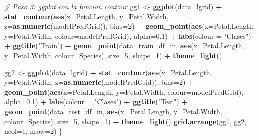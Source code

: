 \documentclass[]{book}
\newenvironment{Shaded}{\begin{snugshade}}{\end{snugshade}}
\newcommand{\CommentTok}[1]{\textcolor[rgb]{0.56,0.35,0.01}{\textit{#1}}}
\newcommand{\DataTypeTok}[1]{\textcolor[rgb]{0.13,0.29,0.53}{#1}}
\newcommand{\DecValTok}[1]{\textcolor[rgb]{0.00,0.00,0.81}{#1}}
\newcommand{\FloatTok}[1]{\textcolor[rgb]{0.00,0.00,0.81}{#1}}
\newcommand{\KeywordTok}[1]{\textcolor[rgb]{0.13,0.29,0.53}{\textbf{#1}}}
\newcommand{\NormalTok}[1]{#1}
\newcommand{\OperatorTok}[1]{\textcolor[rgb]{0.81,0.36,0.00}{\textbf{#1}}}
\newcommand{\StringTok}[1]{\textcolor[rgb]{0.31,0.60,0.02}{#1}}
\begin{document}
\begin{Shaded}
\begin{Highlighting}[]
  \CommentTok{# Paso 3: ggplot con la funcion contour}
\NormalTok{  gg1 <-}\StringTok{ }\KeywordTok{ggplot}\NormalTok{(}\DataTypeTok{data=}\NormalTok{lgrid) }\OperatorTok{+}
\StringTok{    }\KeywordTok{stat_contour}\NormalTok{(}\KeywordTok{aes}\NormalTok{(}\DataTypeTok{x=}\NormalTok{Petal.Length, }\DataTypeTok{y=}\NormalTok{Petal.Width, }\DataTypeTok{z=}\KeywordTok{as.numeric}\NormalTok{(modelPredGrid)), }\DataTypeTok{bins=}\DecValTok{2}\NormalTok{) }\OperatorTok{+}
\StringTok{    }\KeywordTok{geom_point}\NormalTok{(}\KeywordTok{aes}\NormalTok{(}\DataTypeTok{x=}\NormalTok{Petal.Length, }\DataTypeTok{y=}\NormalTok{Petal.Width, }\DataTypeTok{colour=}\NormalTok{modelPredGrid), }\DataTypeTok{alpha=}\FloatTok{0.1}\NormalTok{) }\OperatorTok{+}
\StringTok{    }\KeywordTok{labs}\NormalTok{(}\DataTypeTok{colour =} \StringTok{"Clases"}\NormalTok{) }\OperatorTok{+}\StringTok{ }\KeywordTok{ggtitle}\NormalTok{(}\StringTok{"Train"}\NormalTok{) }\OperatorTok{+}
\StringTok{    }\KeywordTok{geom_point}\NormalTok{(}\DataTypeTok{data=}\NormalTok{train_df_in,}
               \KeywordTok{aes}\NormalTok{(}\DataTypeTok{x=}\NormalTok{Petal.Length, }\DataTypeTok{y=}\NormalTok{Petal.Width,}
                   \DataTypeTok{colour=}\NormalTok{Species), }\DataTypeTok{size=}\DecValTok{5}\NormalTok{, }\DataTypeTok{shape=}\DecValTok{1}\NormalTok{) }\OperatorTok{+}
\StringTok{    }\KeywordTok{theme_light}\NormalTok{()}

\NormalTok{  gg2 <-}\StringTok{ }\KeywordTok{ggplot}\NormalTok{(}\DataTypeTok{data=}\NormalTok{lgrid) }\OperatorTok{+}
\StringTok{    }\KeywordTok{stat_contour}\NormalTok{(}\KeywordTok{aes}\NormalTok{(}\DataTypeTok{x=}\NormalTok{Petal.Length, }\DataTypeTok{y=}\NormalTok{Petal.Width, }\DataTypeTok{z=}\KeywordTok{as.numeric}\NormalTok{(modelPredGrid)), }\DataTypeTok{bins=}\DecValTok{2}\NormalTok{) }\OperatorTok{+}
\StringTok{    }\KeywordTok{geom_point}\NormalTok{(}\KeywordTok{aes}\NormalTok{(}\DataTypeTok{x=}\NormalTok{Petal.Length, }\DataTypeTok{y=}\NormalTok{Petal.Width, }\DataTypeTok{colour=}\NormalTok{modelPredGrid), }\DataTypeTok{alpha=}\FloatTok{0.1}\NormalTok{) }\OperatorTok{+}
\StringTok{    }\KeywordTok{labs}\NormalTok{(}\DataTypeTok{colour =} \StringTok{"Clases"}\NormalTok{) }\OperatorTok{+}\StringTok{ }\KeywordTok{ggtitle}\NormalTok{(}\StringTok{"Test"}\NormalTok{) }\OperatorTok{+}
\StringTok{    }\KeywordTok{geom_point}\NormalTok{(}\DataTypeTok{data=}\NormalTok{test_df_in,}
               \KeywordTok{aes}\NormalTok{(}\DataTypeTok{x=}\NormalTok{Petal.Length, }\DataTypeTok{y=}\NormalTok{Petal.Width,}
                   \DataTypeTok{colour=}\NormalTok{Species), }\DataTypeTok{size=}\DecValTok{5}\NormalTok{, }\DataTypeTok{shape=}\DecValTok{1}\NormalTok{) }\OperatorTok{+}
\StringTok{    }\KeywordTok{theme_light}\NormalTok{()}
  \KeywordTok{grid.arrange}\NormalTok{(gg1, gg2, }\DataTypeTok{ncol=}\DecValTok{1}\NormalTok{, }\DataTypeTok{nrow=}\DecValTok{2}\NormalTok{)}
\NormalTok{\}}
\end{Highlighting}
\end{Shaded}
\end{document}
